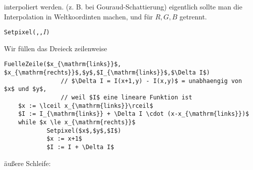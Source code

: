 		interpoliert werden. (z. B. bei Gouraud-Schattierung) eigentlich sollte man die Interpolation
		in Weltkoordinten machen, und für $R, G, B$ getrennt.
		\begin{center}
		\texttt{Setpixel(,,$I$)}\\[1em]
		\end{center}
		Wir füllen das Dreieck zeilenweise
		\begin{lstlisting}[mathescape=true]
FuelleZeile($x_{\mathrm{links}}$, $x_{\mathrm{rechts}}$,$y$,$I_{\mathrm{links}}$,$\Delta I$)
				// $\Delta I = I(x+1,y) - I(x,y)$ = unabhaengig von $x$ und $y$,
				// weil $I$ eine lineare Funktion ist
	$x := \lceil x_{\mathrm{links}}\rceil$
	$I := I_{\mathrm{links}} + \Delta I \cdot (x-x_{\mathrm{links}})$
	while $x \le x_{\mathrm{rechts}}$
			Setpixel($x$,$y$,$I$)
			$x := x+1$
			$I := I + \Delta I$
		\end{lstlisting}
		äußere Schleife:
